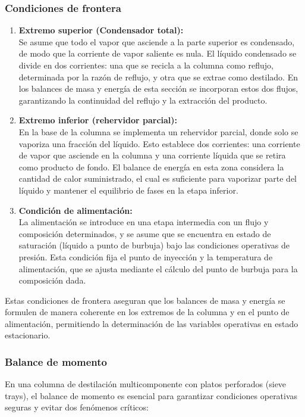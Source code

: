 \subsubsection{Condiciones de frontera}
\begin{enumerate}
    \item \textbf{Extremo superior (Condensador total):}\\
          Se asume que todo el vapor que asciende a la parte superior es condensado, de modo que la corriente de vapor saliente es nula. El líquido condensado se divide en dos corrientes: una que se recicla a la columna como reflujo, determinada por la razón de reflujo, y otra que se extrae como destilado. En los balances de masa y energía de esta sección se incorporan estos dos flujos, garantizando la continuidad del reflujo y la extracción del producto.
    \item \textbf{Extremo inferior (rehervidor parcial):}\\
          En la base de la columna se implementa un rehervidor parcial, donde solo se vaporiza una fracción del líquido. Esto establece dos corrientes: una corriente de vapor que asciende en la columna y una corriente líquida que se retira como producto de fondo. El balance de energía en esta zona considera la cantidad de calor suministrado, el cual es suficiente para vaporizar parte del líquido y mantener el equilibrio de fases en la etapa inferior.
    \item \textbf{Condición de alimentación:}\\
          La alimentación se introduce en una etapa intermedia con un flujo y composición determinados, y se asume que se encuentra en estado de saturación (líquido a punto de burbuja) bajo las condiciones operativas de presión. Esta condición fija el punto de inyección y la temperatura de alimentación, que se ajusta mediante el cálculo del punto de burbuja para la composición dada.
\end{enumerate}

Estas condiciones de frontera aseguran que los balances de masa y energía se formulen de manera coherente en los extremos de la columna y en el punto de alimentación, permitiendo la determinación de las variables operativas en estado estacionario.

\newpage
\subsubsection{Balance de momento}
En una columna de destilación multicomponente con platos perforados (sieve trays), el balance de momento es esencial para garantizar condiciones operativas seguras y evitar dos fenómenos críticos:

